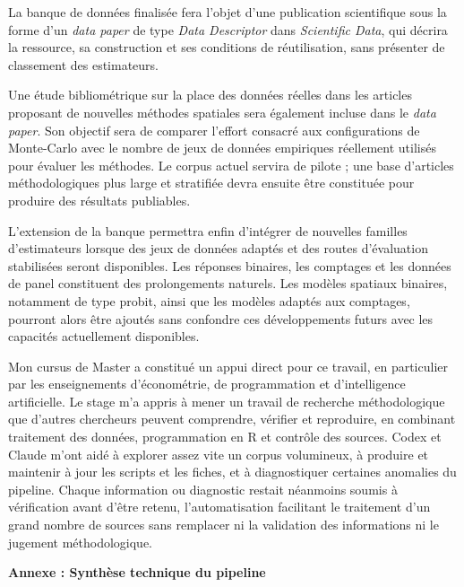 \documentclass[11pt,a4paper]{article}
\begin{document}
La banque de données finalisée fera l'objet d'une publication scientifique sous la forme d'un \textit{data paper} de type \textit{Data Descriptor} dans \textit{Scientific Data}, qui décrira la ressource, sa construction et ses conditions de réutilisation, sans présenter de classement des estimateurs.

Une étude bibliométrique sur la place des données réelles dans les articles proposant de nouvelles méthodes spatiales sera également incluse dans le \textit{data paper}. Son objectif sera de comparer l'effort consacré aux configurations de Monte-Carlo avec le nombre de jeux de données empiriques réellement utilisés pour évaluer les méthodes. Le corpus actuel servira de pilote ; une base d'articles méthodologiques plus large et stratifiée devra ensuite être constituée pour produire des résultats publiables.

L'extension de la banque permettra enfin d'intégrer de nouvelles familles d'estimateurs lorsque des jeux de données adaptés et des routes d'évaluation stabilisées seront disponibles. Les réponses binaires, les comptages et les données de panel constituent des prolongements naturels. Les modèles spatiaux binaires, notamment de type probit, ainsi que les modèles adaptés aux comptages, pourront alors être ajoutés sans confondre ces développements futurs avec les capacités actuellement disponibles.

Mon cursus de Master a constitué un appui direct pour ce travail, en particulier par les enseignements d'économétrie, de programmation et d'intelligence artificielle. Le stage m'a appris à mener un travail de recherche méthodologique que d'autres chercheurs peuvent comprendre, vérifier et reproduire, en combinant traitement des données, programmation en R et contrôle des sources. Codex et Claude m'ont aidé à explorer assez vite un corpus volumineux, à produire et maintenir à jour les scripts et les fiches, et à diagnostiquer certaines anomalies du pipeline. Chaque information ou diagnostic restait néanmoins soumis à vérification avant d'être retenu, l'automatisation facilitant le traitement d'un grand nombre de sources sans remplacer ni la validation des informations ni le jugement méthodologique.

\clearpage
\appendix

{}
\vspace{1.2\baselineskip}
{\large\bfseries\color{myblue}Annexe : Synthèse technique du pipeline\par}
\vspace{0.6\baselineskip}
\label{annexe:pipeline}
\end{document}
